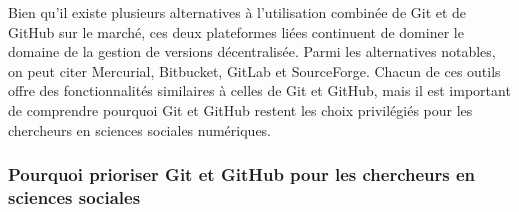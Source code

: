 \documentclass[
  letterpaper,
]{scrbook}
\begin{document}
Bien qu'il existe plusieurs alternatives à l'utilisation combinée de Git
et de GitHub sur le marché, ces deux plateformes liées continuent de
dominer le domaine de la gestion de versions décentralisée. Parmi les
alternatives notables, on peut citer Mercurial, Bitbucket, GitLab et
SourceForge. Chacun de ces outils offre des fonctionnalités similaires à
celles de Git et GitHub, mais il est important de comprendre pourquoi
Git et GitHub restent les choix privilégiés pour les chercheurs en
sciences sociales numériques.

\hypertarget{pourquoi-prioriser-git-et-github-pour-les-chercheurs-en-sciences-sociales}{%
\subsubsection{Pourquoi prioriser Git et GitHub pour les chercheurs en
sciences
sociales}\label{pourquoi-prioriser-git-et-github-pour-les-chercheurs-en-sciences-sociales}}
\end{document}
